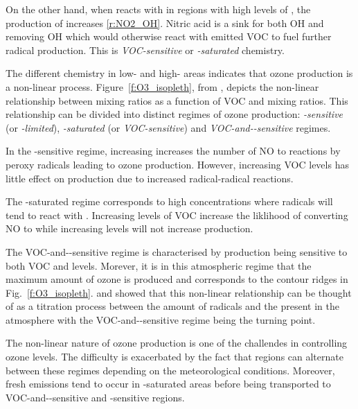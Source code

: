 On the other hand, when  reacts with  in regions with high levels of , the production of  increases \eqref{r:NO2_OH}.
Nitric acid is a sink for both OH and  removing OH which would otherwise react with emitted VOC to fuel further radical production.
This is \emph{VOC-sensitive} or \emph{-saturated} chemistry.

The different chemistry in low- and high- areas indicates that ozone production is a non-linear process.
Figure~\ref{f:O3_isopleth}, from \citet{Jenkin:2000}, depicts the non-linear relationship between  mixing ratios as a function of VOC and  mixing ratios.  
This relationship can be divided into distinct regimes of ozone production: \emph{-sensitive} (or \emph{-limited}), \emph{-saturated} (or \emph{VOC-sensitive}) and \emph{VOC-and--sensitive} regimes. 

In the -sensitive regime, increasing  increases the number of NO to  reactions by peroxy radicals leading to ozone production.
However, increasing VOC levels has little effect on  production due to increased radical-radical reactions.

The -saturated regime corresponds to high  concentrations where radicals will tend to react with . 
Increasing levels of VOC increase the liklihood of  converting NO to  while increasing  levels will not increase  production.

The VOC-and--sensitive regime is characterised by  production being sensitive to both VOC and  levels. 
Morever, it is in this atmospheric regime that the maximum amount of ozone is produced and corresponds to the contour ridges in Fig.~\ref{f:O3_isopleth}.
\citet{Kleinman:1991} and \citet{Kleinman:1994} showed that this non-linear relationship can be thought of as a titration process between the amount of radicals and the  present in the atmosphere with the VOC-and--sensitive regime being the turning point.

The non-linear nature of ozone production is one of the challendes in controlling ozone levels.
The difficulty is exacerbated by the fact that regions can alternate between these regimes depending on the meteorological conditions.
Moreover, fresh emissions tend to occur in -saturated areas before being transported to VOC-and--sensitive and -sensitive regions.

